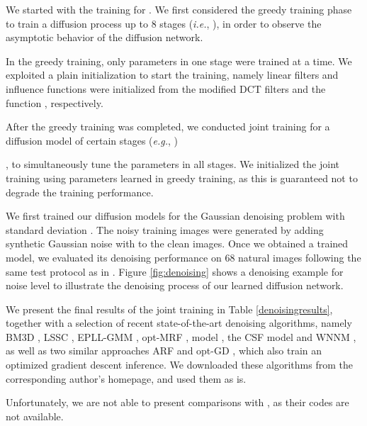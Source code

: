 \documentclass[10pt,journal,compsoc]{IEEEtran}
\newcommand{\eg}{\emph{e.g.}}
\newcommand{\ie}{\emph{i.e.}}
\begin{document}
We started with the training for . We first 
considered the greedy training phase to train a 
diffusion process up to 8 stages (\ie, ), 
in order to observe the asymptotic behavior of the diffusion network. 
{
In the greedy training, only parameters in one stage were trained at a time. 
We exploited a plain initialization to start the training, namely 
linear filters and influence functions were initialized from the 
modified DCT filters and the function , respectively. 

After the greedy training was completed, we conducted joint training for a diffusion 
model of certain stages (\eg, )}, 
to simultaneously tune the parameters in all stages.
We initialized the joint training using parameters learned 
in greedy training, as this is guaranteed not to degrade the training performance. 

\begin{comment} 
{In practice, we 
also find that a plain initialization can actually lead to closely similar results. More experiments to investigate the influence of 
initialization appear in Sec. \ref{important}.}

In previous work \cite{CSF2014}, it is shown that joint training 
a model with filters of size  or larger hardly makes a difference relative to the result obtained by the greedy training. 
However, in our work we observed that joint training always improves the result of greedy training. 
\end{comment}

We first trained our diffusion models for the Gaussian denoising problem with standard deviation . The 
noisy training images were generated by adding synthetic Gaussian noise with  to the clean images. 
Once we obtained a trained model, we evaluated its denoising performance on 68 natural images following the same 
test protocol as in \cite{CSF2014, ChenPRB13}. 
Figure \ref{fig:denoising} shows a denoising example for noise level  
to illustrate the 
denoising process of our learned  diffusion network.

We present the final results of the joint training 
in Table \ref{denoisingresults}, together with a selection of recent state-of-the-art denoising algorithms, 
namely BM3D \cite{BM3D}, LSSC \cite{LSSC}, EPLL-GMM \cite{EPLL}, opt-MRF \cite{ChenPRB13},  model 
\cite{ECCV2012RTF}, the CSF model \cite{CSF2014} and WNNM \cite{WNNM}, as well as 
two similar approaches ARF \cite{Barbu2009} and opt-GD \cite{DomkeAISTATS2012}, 
which also train an optimized gradient descent inference. 
We downloaded 
these algorithms from the corresponding author's homepage, and used them as is. 
\begin{comment}
\footnote{The implementation of the 
 model is not available, and we quoted its result from \cite{CSF2014}.}
\end{comment}
Unfortunately, we are not able to present comparisons with 
\cite{liu2010learning, CNNdenoising}, as their codes are not available.
\end{document}
